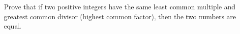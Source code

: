 Prove that if two positive integers have the same least common multiple and greatest common divisor (highest common factor), then the two numbers are equal.
